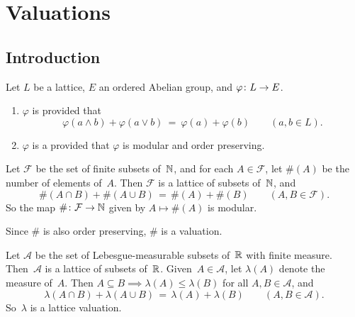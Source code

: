 \documentclass[main.tex]{subfiles}
\begin{document}
\section{Valuations}
\subsection{Introduction}
\noindent
%
%
\begin{dfn}
\label{D:val}
Let $L$ be a lattice, $E$ an ordered Abelian group,
and $\varphi\colon L \rightarrow E$.
\begin{enumerate}
\item
\label{D:val-mod}
$\varphi$ is  provided that
\begin{equation*}
\varphi(a\wedge b) + \varphi(a \vee b)
\ =\ 
\varphi(a) + \varphi(b)
\qquad(a,b\in L).
\end{equation*}

\item
\label{D:val-val}
$\varphi$ is a 
provided that $\varphi$ is modular and order preserving.
\end{enumerate}
\end{dfn}

\begin{ex}
Let $\mathcal{F}$ be the set of finite subsets of~$\mathbb{N}$,
and for each $A\in \mathcal{F}$,
let $\#(A)$ be the number of elements of~$A$.
Then
$\mathcal{F}$ is a lattice of subsets of~$\mathbb{N}$,
and
\begin{equation*}
\#(A\cap B) + \#(A\cup B) \,=\, \#(A) + \#(B)
\qquad(A,B\in\mathcal{F}).
\end{equation*}
So the map $\#\colon \mathcal{F}\rightarrow \mathbb{N}$
given by $A\mapsto \#(A)$ is modular.

Since $\#$ is also order preserving,
$\#$ is a valuation.
\end{ex}

\begin{ex}
\label{E:lmeas-val}
Let $\mathcal{A}$ be the set of Lebesgue-measurable
subsets of~$\mathbb{R}$ with finite measure.
Then~$\mathcal{A}$ is a lattice of subsets of~$\mathbb{R}$.
Given~$A\in\mathcal{A}$,
let $\lambda(A)$ denote the measure of~$A$.
Then $A\subseteq B \implies \lambda(A)\leq \lambda (B)$
for all $A,B\in \mathcal{A}$,
and 
\begin{equation*}
\lambda(A\cap B) + \lambda(A\cup B) \,=\, \lambda(A) + \lambda(B)
\qquad(A,B\in\mathcal{A}).
\end{equation*}
So~$\lambda$ is a lattice valuation.
\end{ex}
\end{document}

